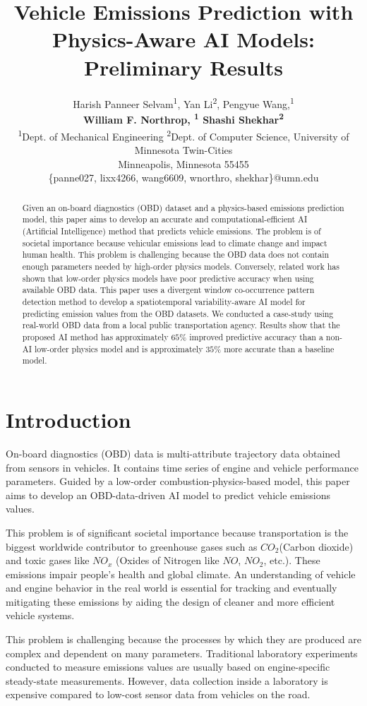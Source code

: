 \documentclass[letterpaper]{article} %
\title{Vehicle Emissions Prediction with Physics-Aware AI Models: Preliminary Results}
\author{Harish Panneer Selvam\textsuperscript{\rm 1}, Yan Li\textsuperscript{\rm 2}, Pengyue Wang,\textsuperscript{\rm 1}
\\  \Large  
\textbf{William F. Northrop, \textsuperscript{\rm 1} Shashi Shekhar\textsuperscript{\rm 2}  }\\
\textsuperscript{\rm 1}Dept. of Mechanical Engineering
\textsuperscript{\rm 2}Dept. of Computer Science, University of Minnesota Twin-Cities \\
Minneapolis, Minnesota 55455
\\\{panne027, lixx4266, wang6609, wnorthro, shekhar\}@umn.edu
}
\begin{document}
\frenchspacing

\maketitle
%
\begin{abstract}
Given an on-board diagnostics (OBD) dataset and a physics-based emissions prediction model, this paper aims to develop an accurate and computational-efficient AI (Artificial Intelligence) method that predicts vehicle emissions. The problem is of societal importance because vehicular emissions lead to climate change and impact human health. This problem is challenging because the OBD data does not contain enough parameters needed by high-order physics models. Conversely, related work has shown that low-order physics models have poor predictive accuracy when using available OBD data. This paper uses a divergent window co-occurrence pattern detection method to develop a spatiotemporal variability-aware AI model for predicting emission values from the OBD datasets. We conducted a case-study using real-world OBD data from a local public transportation agency. Results show that the proposed AI method has approximately $65\%$ improved predictive accuracy than a non-AI low-order physics model and is approximately $35\%$ more accurate than a baseline model.
\end{abstract}
\section{Introduction}

On-board diagnostics (OBD) data is multi-attribute trajectory data obtained from sensors in vehicles. It contains time series of engine and vehicle performance parameters. Guided by a low-order combustion-physics-based model, this paper aims to develop an OBD-data-driven AI model to predict vehicle emissions values.

This problem is of significant societal importance because transportation is the biggest worldwide contributor to greenhouse gases such as $CO_{2}$(Carbon dioxide) and toxic gases like $NO_{x}$ (Oxides of Nitrogen like $NO$, $NO_{2}$, etc.). These emissions impair people's health \cite{article} and global climate. An understanding of vehicle and engine behavior in the real world is essential for tracking and eventually mitigating these emissions by aiding the design of cleaner and more efficient vehicle systems.


This problem is challenging because the processes by which they are produced are complex and dependent on many parameters. Traditional laboratory experiments conducted to measure emissions values are usually based on engine-specific steady-state measurements. However, data collection inside a laboratory is expensive compared to low-cost sensor data from vehicles on the road. 
\end{document}
